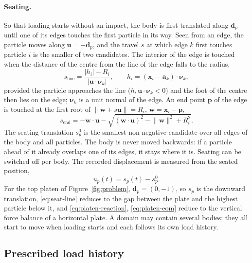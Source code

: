 \paragraph{Seating.}  So that loading starts without an impact, the body is
first translated along $\mathbf{d}_{p}$ until one of its edges touches the first
particle in its way.  Seen from an edge, the particle moves along
$\mathbf{u}=-\mathbf{d}_{p}$, and the travel $s$ at which edge $k$ first touches
particle $i$ is the smaller of two candidates.  The interior of the edge is
touched when the distance of the centre from the line of the edge falls to the
radius,
\begin{equation}
  s_{\text{line}} = \frac{\lvert h_{i}\rvert - R_{i}}
                         {\lvert\mathbf{u}\cdot\boldsymbol{\nu}_{k}\rvert},
  \qquad h_{i} = (\mathbf{x}_{i}-\mathbf{a}_{k})\cdot\boldsymbol{\nu}_{k},
  \label{eq:seat-line}
\end{equation}
provided the particle approaches the line ($h_{i}\,\mathbf{u}\cdot\boldsymbol{\nu}_{k}<0$)
and the foot of the centre then lies on the edge; $\boldsymbol{\nu}_{k}$ is a unit
normal of the edge.  An end point $\mathbf{p}$ of the edge is touched at the
first root of $\lVert\mathbf{w}+s\mathbf{u}\rVert=R_{i}$,
$\mathbf{w}=\mathbf{x}_{i}-\mathbf{p}$,
\begin{equation}
  s_{\text{end}} = -\mathbf{w}\cdot\mathbf{u}
     - \sqrt{(\mathbf{w}\cdot\mathbf{u})^{2}-\lVert\mathbf{w}\rVert^{2}+R_{i}^{2}} .
  \label{eq:seat-end}
\end{equation}
The seating translation $s_{p}^{0}$ is the smallest non-negative candidate over
all edges of the body and all particles.  The body is never moved backwards: if
a particle ahead of it already overlaps one of its edges, it stays where it is.
Seating can be switched off per body.  The recorded displacement is measured
from the seated position,
\begin{equation}
  u_{p}(t) = s_{p}(t) - s_{p}^{0}.
  \label{eq:platen-disp}
\end{equation}
For the top platen of Figure~\ref{fig:problem}, $\mathbf{d}_{p}=(0,-1)$, so
$s_{p}$ is the downward translation, \eqref{eq:seat-line} reduces to the gap
between the plate and the highest particle below it, and
\eqref{eq:platen-reaction}, \eqref{eq:platen-eom} reduce to the vertical force
balance of a horizontal plate.  A domain may contain several bodies; they all
start to move when loading starts and each follows its own load history.

\subsection{Prescribed load history}

